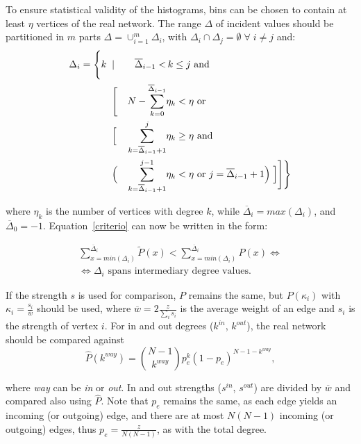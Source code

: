 \documentclass[%
aip,
jmp,%
amsmath,amssymb,
reprint,%
]{revtex4-1}
\begin{document}
To ensure statistical validity of the histograms, bins can be chosen to contain at least $\eta$ vertices of the real network.
The range $\Delta$ of incident values should be partitioned in $m$ parts $\Delta=\cup_{i=1}^m \Delta_i$,
with $\Delta_i\cap \Delta_j=\emptyset \; \forall\; i \neq j$ and:
\begin{align}
\Delta_i =\Biggl\{ k\;\; & | & \overline{\Delta}_{i-1}< &\, k\leq j \text{ and }\;\;\;\;\;\;\;\;\;\;\;\;\nonumber\\
& \Biggl[ & N - \sum_{k=0}^{\overline{\Delta}_{i-1}} & \eta_k< \eta \text{ or }\\
&	\Bigl[ & \sum_{k=\overline{\Delta}_{i-1}+1}^j &  \eta_k \geq \eta \text{ and }\;\;\;\;\;\;\nonumber\\
& \Bigl( &\sum_{k=\overline{\Delta}_{i-1}+1}^{j-1} &  \eta_k < \eta \text{ or }   j=\overline{\Delta}_{i-1}+1 \Bigr) \;\Bigr] \Biggr] \Biggr\}\nonumber
\end{align}

\noindent where $\eta_k$ is the number of vertices with degree $k$, while $\overline{\Delta}_{i}=max(\Delta_{i})$, and $\overline{\Delta}_{0}=-1$. Equation~\ref{criterio} can now be written in the form:

\begin{equation}\label{criterio2}
\begin{split}
\sum_{x=min(\Delta_i)}^{\overline{\Delta}_i} \widetilde{P}(x) < \sum_{x=min(\Delta_i)}^{\overline{\Delta}_i} P(x) \Leftrightarrow \\
\Leftrightarrow \Delta_i \text{ spans intermediary degree values.}
\end{split}
\end{equation}

If the strength $s$ is used for comparison, $P$ remains the same, but $P(\kappa_i)$ with $\kappa_i=\frac{s_i}{\overline{w}}$ should be used, where $\overline{w}=2\frac{z}{\sum_is_i}$ is the average weight of an edge and $s_i$ is the strength of vertex $i$. For in and out degrees ($k^{in}$, $k^{out}$), the real network should be compared against
\begin{equation}
\hat{P}(k^{way})=\binom{N-1}{k^{way}}p_e^k(1-p_e)^{N-1-k^{way}},
\end{equation}

\noindent where \emph{way} can be \emph{in} or \emph{out}. In and out strengths ($s^{in}$, $s^{out}$) are divided by $\overline{w}$ and compared also using $\hat{P}$. Note that $p_e$ remains the same, as each edge yields an incoming (or outgoing) edge, and there are at most $N(N-1)$ incoming (or outgoing) edges, thus $p_e=\frac{z}{N(N-1)}$, as with the total degree.
\end{document}
